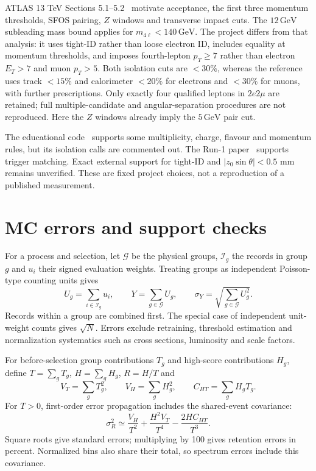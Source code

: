 \documentclass[11pt,a4paper]{article}
\newcommand{\gev}{\,\mathrm{GeV}}
\begin{document}
ATLAS 13 TeV Sections 5.1--5.2~\cite{ATLAS13} motivate acceptance, the first three momentum thresholds, SFOS pairing, $Z$ windows and transverse impact cuts. The $12\gev$ subleading mass bound applies for $m_{4\ell}<140\gev$.
The project differs from that analysis: it uses tight-ID rather than loose electron ID, includes equality at momentum thresholds, and imposes fourth-lepton $p_T\geq7$ rather than electron $E_T>7$ and muon $p_T>5$.
Both isolation cuts are $<30\%$, whereas the reference uses track $<15\%$ and calorimeter $<20\%$ for electrons and $<30\%$ for muons, with further prescriptions.
Only exactly four qualified leptons in $2e2\mu$ are retained; full multiple-candidate and angular-separation procedures are not reproduced. Here the $Z$ windows already imply the $5\gev$ pair cut.

The educational code~\cite{HZZCuts,HZZAnalysis} supports some multiplicity, charge, flavour and momentum rules, but its isolation calls are commented out. The Run-1 paper~\cite{ATLASRun1} supports trigger matching.
Exact external support for tight-ID and $|z_0\sin\theta|<0.5$ mm remains unverified. These are fixed project choices, not a reproduction of a published measurement.

\FloatBarrier
\section{MC errors and support checks}\label{app:errors}
For a process and selection, let $\mathcal G$ be the physical groups, $\mathcal I_g$ the records in group $g$ and $u_i$ their signed evaluation weights.
Treating groups as independent Poisson-type counting units gives
\[
 U_g=\sum_{i\in\mathcal I_g}u_i,\qquad
 Y=\sum_{g\in\mathcal G}U_g,\qquad
 \sigma_Y=\sqrt{\sum_{g\in\mathcal G}U_g^2}.
\]
Records within a group are combined first. The special case of independent unit-weight counts gives $\sqrt{N}$.
Errors exclude retraining, threshold estimation and normalization systematics such as cross sections, luminosity and scale factors.

For before-selection group contributions $T_g$ and high-score contributions $H_g$, define $T=\sum_gT_g$, $H=\sum_gH_g$, $R=H/T$ and
\[
 V_T=\sum_g T_g^2,\qquad V_H=\sum_g H_g^2,\qquad C_{HT}=\sum_g H_gT_g.
\]
For $T>0$, first-order error propagation includes the shared-event covariance:
\[
 \sigma_R^2\simeq\frac{V_H}{T^2}+\frac{H^2V_T}{T^4}-\frac{2H C_{HT}}{T^3}.
\]
Square roots give standard errors; multiplying by 100 gives retention errors in percent. Normalized bins also share their total, so spectrum errors include this covariance.
\end{document}
